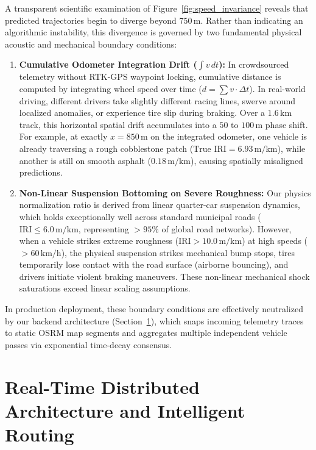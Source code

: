 \documentclass[conference]{IEEEtran}
\begin{document}
A transparent scientific examination of Figure~\ref{fig:speed_invariance} reveals that predicted trajectories begin to diverge beyond $750\,\text{m}$. Rather than indicating an algorithmic instability, this divergence is governed by two fundamental physical acoustic and mechanical boundary conditions:
\begin{enumerate}
    \item \textbf{Cumulative Odometer Integration Drift ($\int v\, dt$):} In crowdsourced telemetry without RTK-GPS waypoint locking, cumulative distance is computed by integrating wheel speed over time ($d = \sum v \cdot \Delta t$). In real-world driving, different drivers take slightly different racing lines, swerve around localized anomalies, or experience tire slip during braking. Over a $1.6\,\text{km}$ track, this horizontal spatial drift accumulates into a $50\text{ to }100\,\text{m}$ phase shift. For example, at exactly $x = 850\,\text{m}$ on the integrated odometer, one vehicle is already traversing a rough cobblestone patch ($\text{True IRI} = 6.93\,\text{m/km}$), while another is still on smooth asphalt ($0.18\,\text{m/km}$), causing spatially misaligned predictions.
    \item \textbf{Non-Linear Suspension Bottoming on Severe Roughness:} Our physics normalization ratio is derived from linear quarter-car suspension dynamics, which holds exceptionally well across standard municipal roads ($\text{IRI} \le 6.0\,\text{m/km}$, representing $>95\%$ of global road networks). However, when a vehicle strikes extreme roughness ($\text{IRI} > 10.0\,\text{m/km}$) at high speeds ($>60\,\text{km/h}$), the physical suspension strikes mechanical bump stops, tires temporarily lose contact with the road surface (airborne bouncing), and drivers initiate violent braking maneuvers. These non-linear mechanical shock saturations exceed linear scaling assumptions.
\end{enumerate}
In production deployment, these boundary conditions are effectively neutralized by our backend architecture (Section~\ref{sec:distributed_backend}), which snaps incoming telemetry traces to static OSRM map segments and aggregates multiple independent vehicle passes via exponential time-decay consensus.

\section{Real-Time Distributed Architecture and Intelligent Routing}
\label{sec:distributed_backend}
\end{document}
